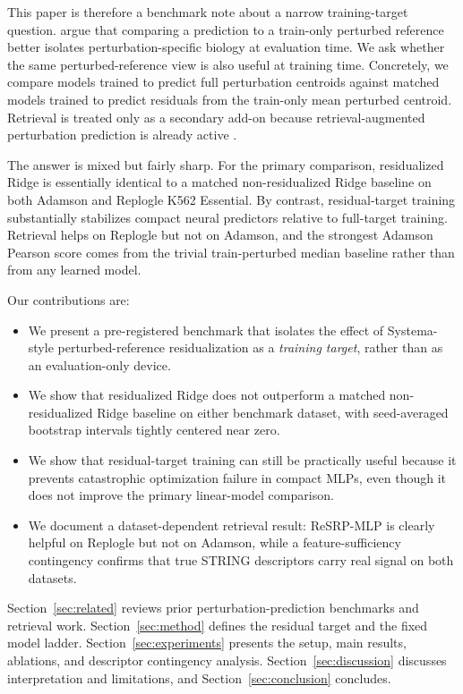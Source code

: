 \documentclass{article}
\begin{document}
This paper is therefore a benchmark note about a narrow training-target question. \citet{vinastorne2025systema} argue that comparing a prediction to a train-only perturbed reference better isolates perturbation-specific biology at evaluation time. We ask whether the same perturbed-reference view is also useful at training time. Concretely, we compare models trained to predict full perturbation centroids against matched models trained to predict residuals from the train-only mean perturbed centroid. Retrieval is treated only as a secondary add-on because retrieval-augmented perturbation prediction is already active \citep{difrancesco2026ptrag}.

The answer is mixed but fairly sharp. For the primary comparison, residualized Ridge is essentially identical to a matched non-residualized Ridge baseline on both Adamson and Replogle K562 Essential. By contrast, residual-target training substantially stabilizes compact neural predictors relative to full-target training. Retrieval helps on Replogle but not on Adamson, and the strongest Adamson Pearson score comes from the trivial train-perturbed median baseline rather than from any learned model.

Our contributions are:
\begin{itemize}
  \item We present a pre-registered benchmark that isolates the effect of Systema-style perturbed-reference residualization as a \emph{training target}, rather than as an evaluation-only device.
  \item We show that residualized Ridge does not outperform a matched non-residualized Ridge baseline on either benchmark dataset, with seed-averaged bootstrap intervals tightly centered near zero.
  \item We show that residual-target training can still be practically useful because it prevents catastrophic optimization failure in compact MLPs, even though it does not improve the primary linear-model comparison.
  \item We document a dataset-dependent retrieval result: ReSRP-MLP is clearly helpful on Replogle but not on Adamson, while a feature-sufficiency contingency confirms that true STRING descriptors carry real signal on both datasets.
\end{itemize}

Section~\ref{sec:related} reviews prior perturbation-prediction benchmarks and retrieval work. Section~\ref{sec:method} defines the residual target and the fixed model ladder. Section~\ref{sec:experiments} presents the setup, main results, ablations, and descriptor contingency analysis. Section~\ref{sec:discussion} discusses interpretation and limitations, and Section~\ref{sec:conclusion} concludes.
\end{document}

